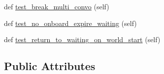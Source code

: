 \begin{DoxyCompactItemize}
\item 
def \hyperlink{classparlai_1_1mturk_1_1core_1_1test_1_1test__full__system_1_1TestMTurkManagerWorkflows_add66c07d44176ab04d777af94f8f046a}{test\+\_\+break\+\_\+multi\+\_\+convo} (self)
\item 
def \hyperlink{classparlai_1_1mturk_1_1core_1_1test_1_1test__full__system_1_1TestMTurkManagerWorkflows_a65ea28ad81308473c22580178fa57a90}{test\+\_\+no\+\_\+onboard\+\_\+expire\+\_\+waiting} (self)
\item 
def \hyperlink{classparlai_1_1mturk_1_1core_1_1test_1_1test__full__system_1_1TestMTurkManagerWorkflows_a1c8e8bb8eca161157b7b5dc154b687f6}{test\+\_\+return\+\_\+to\+\_\+waiting\+\_\+on\+\_\+world\+\_\+start} (self)
\end{DoxyCompactItemize}
\subsection*{Public Attributes}
